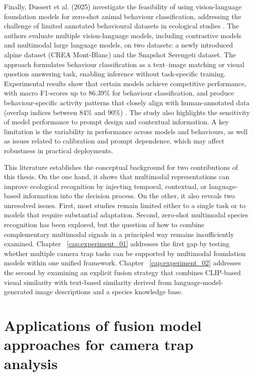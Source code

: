 Finally, Dussert et al. (2025) \citep{dussert2025zero} investigate the feasibility of using vision-language foundation models for zero-shot animal behaviour classification, addressing the challenge of limited annotated behavioural datasets in ecological studies \citep{dussert2025zero}. The authors evaluate multiple vision-language models, including contrastive models and multimodal large language models, on two datasets: a newly introduced alpine dataset (CREA Mont-Blanc) and the Snapshot Serengeti dataset. The approach formulates behaviour classification as a text–image matching or visual question answering task, enabling inference without task-specific training. Experimental results show that certain models achieve competitive performance, with macro F1-scores up to 86.39\% for behaviour classification, and produce behaviour-specific activity patterns that closely align with human-annotated data (overlap indices between 84\% and 90\%) . The study also highlights the sensitivity of model performance to prompt design and contextual information. A key limitation is the variability in performance across models and behaviours, as well as issues related to calibration and prompt dependence, which may affect robustness in practical deployments.


This literature establishes the conceptual background for two contributions of this thesis. On the one hand, it shows that multimodal representations can improve ecological recognition by injecting temporal, contextual, or language-based information into the decision process. On the other, it also reveals two unresolved issues. First, most studies remain limited either to a single task or to models that require substantial adaptation. Second, zero-shot multimodal species recognition has been explored, but the question of how to combine complementary multimodal signals in a principled way remains insufficiently examined. Chapter ~\ref{cap:experiment_01} addresses the first gap by testing whether multiple camera trap tasks can be supported by multimodal foundation models within one unified framework. Chapter ~\ref{cap:experiment_02} addresses the second by examining an explicit fusion strategy that combines CLIP-based visual similarity with text-based similarity derived from language-model-generated image descriptions and a species knowledge base.


\section{Applications of fusion model approaches for camera trap analysis}

